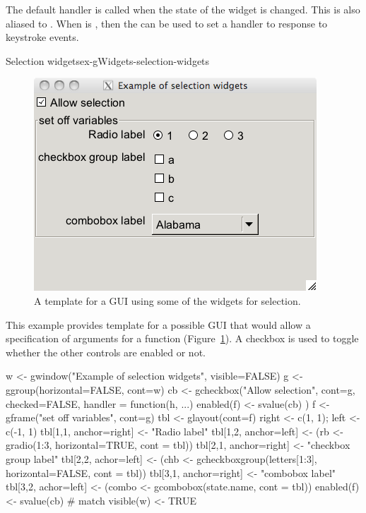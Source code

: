 The default handler is called when the state of the widget is
changed. This is also aliased to
. When  is
, then the  can be
used to set a handler to response to keystroke events.


\begin{example}{Selection widgets}{ex-gWidgets-selection-widgets}
\begin{figure}
  \centering
  \includegraphics[width=.65\textwidth]{ex-gWidgets-selection-widgets}
  \caption{A template for a GUI using some of the widgets for selection.}
  \label{fig:ex-gWidgets-selection-widgets}
\end{figure}

This example provides template for a possible GUI that would allow a
specification of arguments for a function
(Figure~\ref{fig:ex-gWidgets-selection-widgets}).  A checkbox is
used to toggle whether the other controls are enabled or not.
\begin{Schunk}
\begin{Sinput}
 w <- gwindow("Example of selection widgets", visible=FALSE)
 g <- ggroup(horizontal=FALSE, cont=w)
 cb <- gcheckbox("Allow selection", cont=g, checked=FALSE, 
                 handler = function(h, ...) {
                   enabled(f) <- svalue(cb)
                 })
 f <- gframe("set off variables", cont=g)
 tbl <- glayout(cont=f)
 right <- c(1, 1); left <- c(-1, 1)
 tbl[1,1, anchor=right] <- "Radio label"
 tbl[1,2, anchor=left]  <- (rb <- gradio(1:3, horizontal=TRUE, 
            cont = tbl))
 tbl[2,1, anchor=right] <- "checkbox group label"
 tbl[2,2, achor=left] <- (chb <- gcheckboxgroup(letters[1:3], 
            horizontal=FALSE, cont = tbl))
 tbl[3,1, anchor=right] <- "combobox label"
 tbl[3,2, achor=left] <- (combo <- gcombobox(state.name, 
            cont = tbl))
 enabled(f) <- svalue(cb)                # match
 visible(w) <- TRUE
\end{Sinput}
\end{Schunk}
               
    
\end{example}

